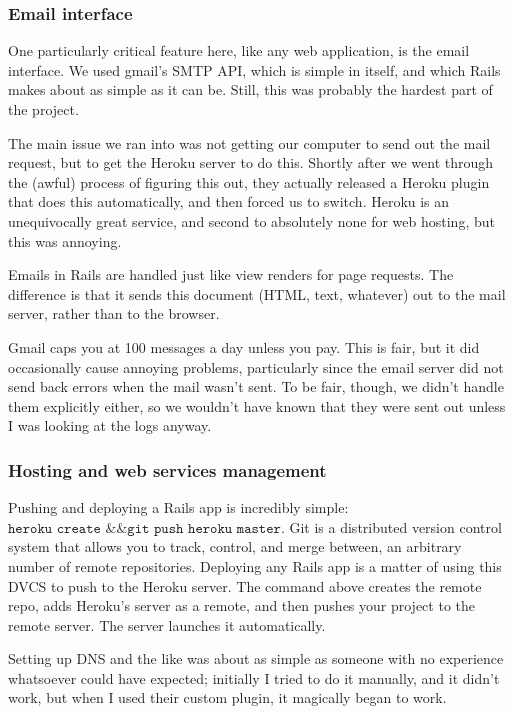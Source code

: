 \documentclass[11pt,a4paper]{article}
\begin{document}
\subsubsection{Email interface}

One particularly critical feature here, like any web application, is the email interface. We used gmail's SMTP API, which is simple in itself, and which Rails makes about as simple as it can be. Still, this was probably the hardest part of the project.

The main issue we ran into was not getting our computer to send out the mail request, but to get the Heroku server to do this. Shortly after we went through the (awful) process of figuring this out, they actually released a Heroku plugin that does this automatically, and then forced us to switch. Heroku is an unequivocally great service, and second to absolutely none for web hosting, but this was annoying.

Emails in Rails are handled just like view renders for page requests. The difference is that it sends this document (HTML, text, whatever) out to the mail server, rather than to the browser.

Gmail caps you at 100 messages a day unless you pay. This is fair, but it did occasionally cause annoying problems, particularly since the email server did not send back errors when the mail wasn't sent. To be fair, though, we didn't handle them explicitly either, so we wouldn't have known that they were sent out unless I was looking at the logs anyway.

\subsubsection{Hosting and web services management}

Pushing and deploying a Rails app is incredibly simple: $\texttt{heroku create \&\& git push heroku}$ $\texttt{master}$. Git is a distributed version control system that allows you to track, control, and merge between, an arbitrary number of remote repositories. Deploying any Rails app is a matter of using this DVCS to push to the Heroku server. The command above creates the remote repo, adds Heroku's server as a remote, and then pushes your project to the remote server. The server launches it automatically.

Setting up DNS and the like was about as simple as someone with no experience whatsoever could have expected; initially I tried to do it manually, and it didn't work, but when I used their custom plugin, it magically began to work.
\end{document}
